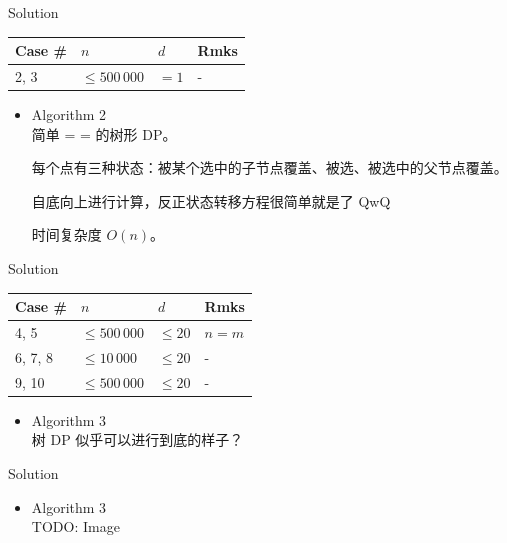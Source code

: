 \documentclass[UTF8]{beamer}
\begin{document}
\begin{frame}{Solution}

\begin{tabularx}{\textwidth}{X|X|X|X} \hline
Case \# & $n$ & $d$ & Rmks \\ \hline \hline
2, 3    & $\leq 500\,000$ & $= 1$     & - \\ \hline
\end{tabularx}
\begin{itemize}
    \item Algorithm 2 \\
        简单 = = 的树形 DP。

        每个点有三种状态：被某个选中的子节点覆盖、被选、被选中的父节点覆盖。

        自底向上进行计算，反正状态转移方程很简单就是了 QwQ

        时间复杂度 $O(n)$。
\end{itemize}

\end{frame}

\begin{frame}{Solution}

\begin{tabularx}{\textwidth}{X|X|X|X} \hline
Case \# & $n$ & $d$ & Rmks \\ \hline \hline
4, 5    & $\leq 500\,000$ & $\leq 20$ & $n = m$ \\ \hline
6, 7, 8 & $\leq 10\,000$  & $\leq 20$ & - \\ \hline
9, 10   & $\leq 500\,000$ & $\leq 20$ & - \\ \hline
\end{tabularx}
\begin{itemize}
    \item Algorithm 3 \\
        树 DP 似乎可以进行到底的样子？
\end{itemize}

\end{frame}

\begin{frame}{Solution}

\begin{itemize}
    \item Algorithm 3 \\
        TODO: Image
\end{itemize}

\end{frame}
\end{document}
